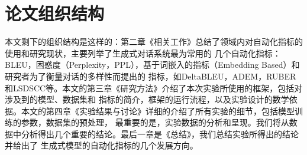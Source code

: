 \section{论文组织结构}\label{sec:论文组织结构}
本文剩下的组织结构是这样的：第二章《相关工作》总结了领域内对自动化指标的使用和研究现状，主要列举了生成式对话系统最为常用的
几个自动化指标：BLEU，困惑度（Perplexity，PPL），基于词嵌入的指标（Embedding Based）和研究者为了衡量对话的多样性而提出的
指标，如DeltaBLEU，ADEM，RUBER和LSDSCC等。本文的第三章《研究方法》介绍了本次实验所使用的框架，包括对涉及到的模型、数据集和
指标的简介，框架的运行流程，以及实验设计的数学依据。本文的第四章《实验结果与讨论》详细的介绍了所有实验的细节，包括模型训练的参数，数据集的预处理，
最重要的是，实验数据的分析和呈现。我们将从数据中分析得出几个重要的结论。最后一章是《总结》，我们总结实验所得出的结论并给出了
生成式模型的自动化指标的几个发展方向。
